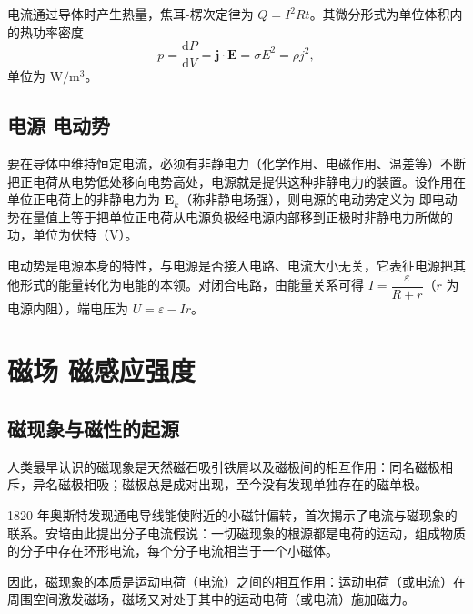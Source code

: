    电流通过导体时产生热量，焦耳-楞次定律为 $Q=I^{2}Rt$。其微分形式为单位体积内的热功率密度
    \[
    p=\frac{\mathrm{d}P}{\mathrm{d}V}=\boldsymbol{j}\cdot\boldsymbol{E}=\sigma E^{2}=\rho j^{2},
    \]
    单位为 $\mathrm{W/m^{3}}$。

    \subsection{电源 电动势}
    要在导体中维持恒定电流，必须有非静电力（化学作用、电磁作用、温差等）不断把正电荷从电势低处移向电势高处，电源就是提供这种非静电力的装置。设作用在单位正电荷上的非静电力为 $\boldsymbol{E}_k$（称非静电场强），则电源的电动势定义为
    即电动势在量值上等于把单位正电荷从电源负极经电源内部移到正极时非静电力所做的功，单位为伏特（$\mathrm{V}$）。

    电动势是电源本身的特性，与电源是否接入电路、电流大小无关，它表征电源把其他形式的能量转化为电能的本领。对闭合电路，由能量关系可得 $I=\dfrac{\varepsilon}{R+r}$（$r$ 为电源内阻），端电压为 $U=\varepsilon-Ir$。


\section{磁场 磁感应强度}
    \subsection{磁现象与磁性的起源}
    人类最早认识的磁现象是天然磁石吸引铁屑以及磁极间的相互作用：同名磁极相斥，异名磁极相吸；磁极总是成对出现，至今没有发现单独存在的磁单极。

    1820 年奥斯特发现通电导线能使附近的小磁针偏转，首次揭示了电流与磁现象的联系。安培由此提出分子电流假说：一切磁现象的根源都是电荷的运动，组成物质的分子中存在环形电流，每个分子电流相当于一个小磁体。

    因此，磁现象的本质是运动电荷（电流）之间的相互作用：运动电荷（或电流）在周围空间激发磁场，磁场又对处于其中的运动电荷（或电流）施加磁力。

